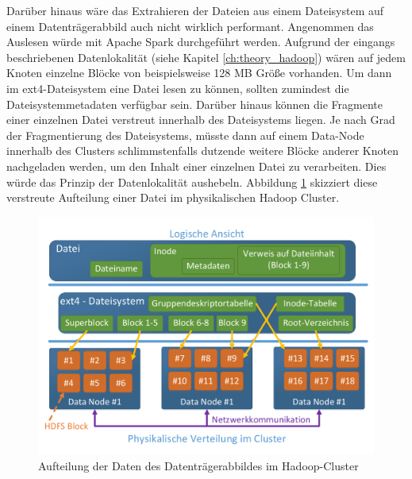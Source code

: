 \noindent
Darüber hinaus wäre das Extrahieren der Dateien aus einem Dateisystem auf einem Datenträgerabbild auch nicht wirklich performant. Angenommen das Auslesen würde mit Apache Spark durchgeführt werden. Aufgrund der eingangs beschriebenen Datenlokalität (siehe Kapitel \ref{ch:theory_hadoop}) wären auf jedem Knoten einzelne Blöcke von beispielsweise 128 MB Größe vorhanden. Um dann im ext4-Dateisystem eine Datei lesen zu können, sollten zumindest die Dateisystemmetadaten verfügbar sein. Darüber hinaus können die Fragmente einer einzelnen Datei verstreut innerhalb des Dateisystems liegen. Je nach Grad der Fragmentierung des Dateisystems, müsste dann auf einem Data-Node innerhalb des Clusters schlimmstenfalls dutzende weitere Blöcke anderer Knoten nachgeladen werden, um den Inhalt einer einzelnen Datei zu verarbeiten. Dies würde das Prinzip der Datenlokalität aushebeln. Abbildung \ref{fig:ext4_to_hdfs} skizziert diese verstreute Aufteilung einer Datei im physikalischen Hadoop Cluster.\\ 
\begin{figure}[ht]
  \centering
  \includegraphics[width=\textwidth]{./resource/ext4_to_hdfs.pdf}
  \caption{Aufteilung der Daten des Datenträgerabbildes im Hadoop-Cluster}
  \label{fig:ext4_to_hdfs}
\end{figure}

